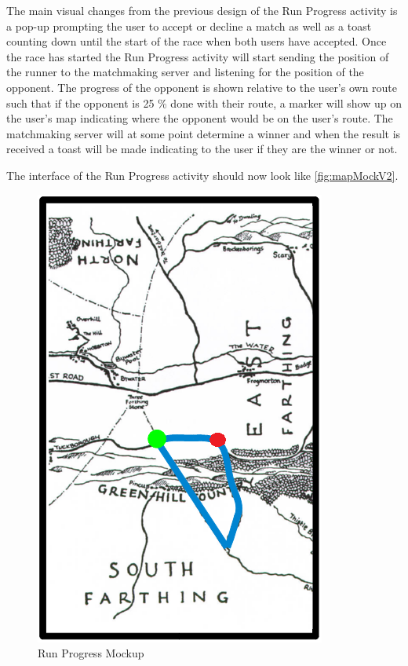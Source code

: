 The main visual changes from the previous design of the Run Progress activity is a pop-up prompting the user to accept or decline a match as well as a toast counting down until the start of the race when both users have accepted. Once the race has started the Run Progress activity will start sending the position of the runner to the matchmaking server and listening for the position of the opponent. The progress of the opponent is shown relative to the user's own route such that if the opponent is 25 \% done with their route, a marker will show up on the user's map indicating where the opponent would be on the user's route. The matchmaking server will at some point determine a winner and when the result is received a toast will be made indicating to the user if they are the winner or not.

The interface of the Run Progress activity should now look like \autoref{fig:mapMockV2}.

\begin{figure}[!ht]
	\begin{center}
		\includegraphics[scale=0.4]{img/mapMockV2.png}
		\caption{Run Progress Mockup}
		\label{fig:mapMockV2}
	\end{center}
\end{figure}

